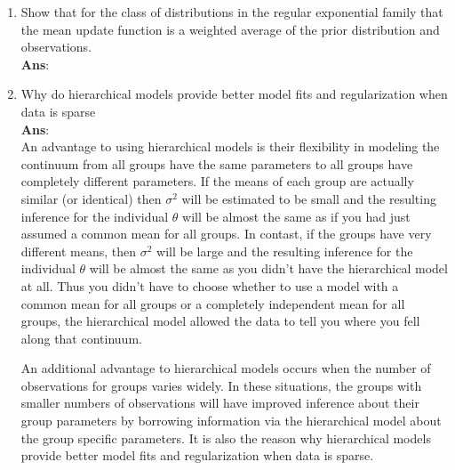 \documentclass{article}
\begin{document}
\begin{enumerate}
\begin{enumerate}
(e) It grows at least like $n^2$ when C is small and $n^3$ when C gets large



\item Show that for the class of distributions in the regular exponential family that the mean update function is a weighted average of the prior distribution and observations. \\
\textbf{Ans}:\\


\item Why do hierarchical models provide better model fits and regularization when data is sparse \\
\textbf{Ans}:\\
An advantage to using hierarchical models is their flexibility in modeling the continuum from all groups have the same parameters to all groups have completely different parameters.  If the means of each group are actually similar (or identical) then $\sigma^2$
will be estimated to be small and the resulting inference for the individual $\theta$ will be almost the same as if you had just assumed a common mean for all groups.  In contast, if the groups have very different means, then $\sigma^2$ will be large and the resulting inference for the individual $\theta$ will be almost the same as you didn't have the hierarchical model at all.  Thus you didn't have to choose whether to use a model with a common mean for all groups or a completely independent mean for all groups, the hierarchical model allowed the data to tell you where you fell along that continuum.

An additional advantage to hierarchical models occurs when the number of observations for groups varies widely. In these situations, the groups with smaller numbers of observations will have improved inference about their group parameters by borrowing information via the hierarchical model about the group specific parameters. It is also the reason why  hierarchical models provide better model fits and regularization when data is sparse.

\end{enumerate}

\end{enumerate}
\end{document}
